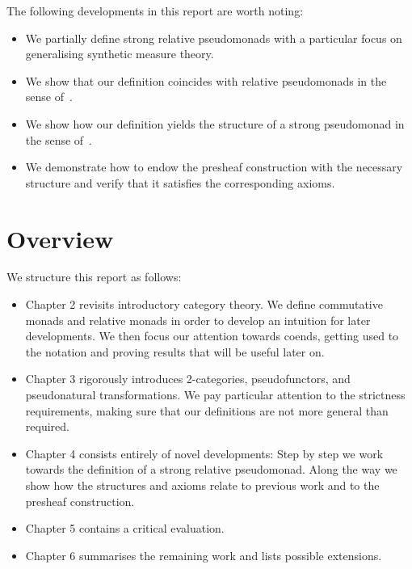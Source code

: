 The following developments in this report are worth noting:

\begin{itemize}
  \item We partially define strong relative pseudomonads with a particular 
    focus on generalising synthetic measure theory.
  \item We show that our definition coincides with relative pseudomonads
    in the sense of~\cite{fiore2017}.
  \item We show how our definition yields the structure of a strong
    pseudomonad in the sense of~\cite{saville2023}.
  \item We demonstrate how to endow the presheaf construction with the
    necessary structure and verify that it satisfies the corresponding
    axioms.
\end{itemize}

\section{Overview}

We structure this report as follows:
\begin{itemize}
  \item Chapter 2 revisits introductory category theory. We define commutative
    monads and relative monads in order to develop an intuition for later
    developments. We then focus our attention towards coends, getting used to
    the notation and proving results that will be useful later on.
  \item Chapter 3 rigorously introduces 2-categories, pseudofunctors, and
    pseudonatural transformations. We pay particular attention to the strictness
    requirements, making sure that our definitions are not more general than required.
  \item Chapter 4 consists entirely of novel developments: Step by step we work towards
    the definition of a strong relative pseudomonad. Along the way we show how the
    structures and axioms relate to previous work and to the presheaf construction.
  \item Chapter 5 contains a critical evaluation.
  \item Chapter 6 summarises the remaining work and lists possible extensions.
\end{itemize}


